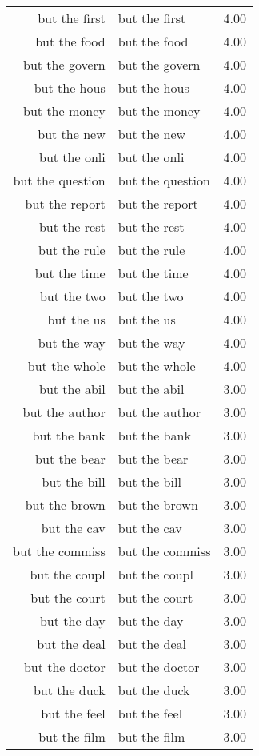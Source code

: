 \begin{table}[ht]
\begin{tabular}{rlr}
  but the first & but the first & 4.00 \\ 
  but the food & but the food & 4.00 \\ 
  but the govern & but the govern & 4.00 \\ 
  but the hous & but the hous & 4.00 \\ 
  but the money & but the money & 4.00 \\ 
  but the new & but the new & 4.00 \\ 
  but the onli & but the onli & 4.00 \\ 
  but the question & but the question & 4.00 \\ 
  but the report & but the report & 4.00 \\ 
  but the rest & but the rest & 4.00 \\ 
  but the rule & but the rule & 4.00 \\ 
  but the time & but the time & 4.00 \\ 
  but the two & but the two & 4.00 \\ 
  but the us & but the us & 4.00 \\ 
  but the way & but the way & 4.00 \\ 
  but the whole & but the whole & 4.00 \\ 
  but the abil & but the abil & 3.00 \\ 
  but the author & but the author & 3.00 \\ 
  but the bank & but the bank & 3.00 \\ 
  but the bear & but the bear & 3.00 \\ 
  but the bill & but the bill & 3.00 \\ 
  but the brown & but the brown & 3.00 \\ 
  but the cav & but the cav & 3.00 \\ 
  but the commiss & but the commiss & 3.00 \\ 
  but the coupl & but the coupl & 3.00 \\ 
  but the court & but the court & 3.00 \\ 
  but the day & but the day & 3.00 \\ 
  but the deal & but the deal & 3.00 \\ 
  but the doctor & but the doctor & 3.00 \\ 
  but the duck & but the duck & 3.00 \\ 
  but the feel & but the feel & 3.00 \\ 
  but the film & but the film & 3.00 \\ 

\end{tabular}
\end{table}
